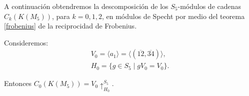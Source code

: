 \documentclass[12pt]{book}
\theoremstyle{definition}
\newcounter{in}
\begin{document}
A continuación obtendremos la descomposición de los $S_{5}$-módulos de
cadenas $C_{k}(K(M_{5}))$, para $k=0,1,2$, en
módulos de Specht por medio del teorema \ref{frobenius} de la reciprocidad de Frobenius.

Consideremos:
\begin{eqnarray*}
V_{0}=\langle a_{1}\rangle=\langle
(\overline{12},\overline{34})\rangle,\\
H_{0}=\{g\in S_{5}\mid gV_{0}=V_{0}\}.
\end{eqnarray*}

Entonces $C_{0}(K(M_{5}))=V_{0}\uparrow^{S_{5}}_{H_0}$.

  \begin{table}[!hbtp]
    \centering
    
    \caption{Caracteres de $S_{5}$ restringidos a $H_{0}$ y carácter de $V_{0}$}
    \label{tab:clanes-H_0-5}
  \end{table}
\end{document}
